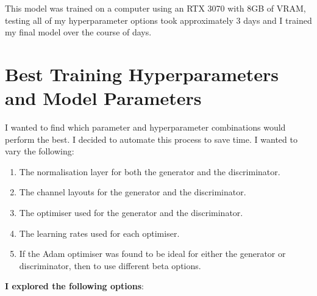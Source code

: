 \documentclass{UoYCSproject}
\begin{document}
This model was trained on a computer using an RTX 3070 with 8GB of VRAM, testing all of my hyperparameter options took approximately 3 days and I trained my final model over the course of 
days.

\section{Best Training Hyperparameters and Model Parameters}

I wanted to find which parameter and hyperparameter combinations would perform the best. I decided to automate this process to save time. I wanted to vary the following:
\begin{enumerate}
\item The normalisation layer for both the generator and the discriminator.
\item The channel layouts for the generator and the discriminator.
\item The optimiser used for the generator and the discriminator.
\item The learning rates used for each optimiser.
\item If the Adam optimiser was found to be ideal for either the generator or discriminator, then to use different beta options.
\end{enumerate}

\textbf{I explored the following options}:
\end{document}
